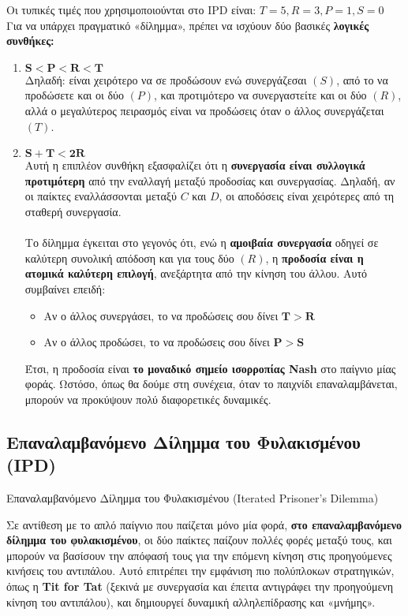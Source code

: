 Οι τυπικές τιμές που χρησιμοποιούνται στο IPD είναι:
\(T = 5, R = 3, P = 1, S = 0\)
\\
\clearpage
Για να υπάρχει πραγματικό «δίλημμα», πρέπει να ισχύουν δύο βασικές \textbf{λογικές συνθήκες:
}
\begin{enumerate}
	\item \(\bm{S<P<R<T}\)\\
	Δηλαδή: είναι χειρότερο να σε προδώσουν ενώ συνεργάζεσαι \((S)\), από το να προδώσετε και οι δύο \((P)\), και προτιμότερο να συνεργαστείτε και οι δύο \((R)\), αλλά ο μεγαλύτερος πειρασμός είναι να προδώσεις όταν ο άλλος συνεργάζεται \((T)\).
	\\
	\item \(\bm{S + T < 2R}\) \\Αυτή η επιπλέον συνθήκη εξασφαλίζει ότι η\textbf{ συνεργασία είναι συλλογικά προτιμότερη} από την εναλλαγή μεταξύ προδοσίας και συνεργασίας. Δηλαδή, αν οι παίκτες εναλλάσσονται μεταξύ \(C \) και \(D\), οι αποδόσεις είναι χειρότερες από τη σταθερή συνεργασία.
	\\
	\\
	Το δίλημμα έγκειται στο γεγονός ότι, ενώ η \textbf{αμοιβαία συνεργασία} οδηγεί σε καλύτερη συνολική απόδοση και για τους δύο \((R)\), η \textbf{προδοσία είναι η ατομικά καλύτερη επιλογή}, ανεξάρτητα από την κίνηση του άλλου. Αυτό συμβαίνει επειδή:
	\begin{itemize}
		\item Αν ο άλλος συνεργάσει, το να προδώσεις σου δίνει \(\bm{T > R}\)
		\item Αν ο άλλος προδώσει, το να προδώσεις σου δίνει \(\bm{P > S}\)
		
		
	\end{itemize}
	Έτσι, η προδοσία είναι \textbf{το μοναδικό σημείο ισορροπίας Nash} στο παίγνιο μίας φοράς. Ωστόσο, όπως θα δούμε στη συνέχεια, όταν το παιχνίδι επαναλαμβάνεται, μπορούν να προκύψουν πολύ διαφορετικές δυναμικές.
	
\end{enumerate}
\subsection*{Επαναλαμβανόμενο Δίλημμα του Φυλακισμένου (IPD)}
Επαναλαμβανόμενο Δίλημμα του Φυλακισμένου (Iterated Prisoner's Dilemma)

Σε αντίθεση με το απλό παίγνιο που παίζεται μόνο μία φορά, \textbf{στο επαναλαμβανόμενο δίλημμα του φυλακισμένου}, οι δύο παίκτες παίζουν πολλές φορές μεταξύ τους, και μπορούν να βασίσουν την απόφασή τους για την επόμενη κίνηση στις προηγούμενες κινήσεις του αντιπάλου. Αυτό επιτρέπει την εμφάνιση πιο πολύπλοκων στρατηγικών, όπως η \textbf{Tit for Tat} (ξεκινά με συνεργασία και έπειτα αντιγράφει την προηγούμενη κίνηση του αντιπάλου), και δημιουργεί δυναμική αλληλεπίδρασης και «μνήμης».

